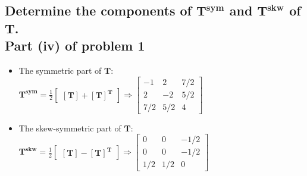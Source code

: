 \documentclass[10pt, letterpaper]{article}
\begin{document}
	\subsection{Determine the components of $\bm{T^{sym}}$ and $\bm{T^{skw}}$ of $\bm{T}$.\\
				Part (iv) of problem 1}
		\begin{itemize}
			\item The symmetric part of $\bm{T}$:\\
				$\bm{T^{sym}} = \frac{1}{2} \begin{bmatrix} \bm{[T]}  + \bm{[T]^T} \end{bmatrix} \Rightarrow
				\begin{bmatrix} -1 & 2 & 7/2\\
							2 & -2 & 5/2 \\
							7/2 & 5/2 & 4
				\end{bmatrix}$
			
			\item The skew-symmetric part of $\bm{T}$:\\
				$\bm{T^{skw}} = \frac{1}{2} \begin{bmatrix} \bm{[T]}  - \bm{[T]^T} \end{bmatrix} \Rightarrow
				\begin{bmatrix} 0 & 0 & -1/2\\
							0 & 0 & -1/2 \\
							1/2 & 1/2 & 0
				\end{bmatrix}$

		\end{itemize}

\end{document}

